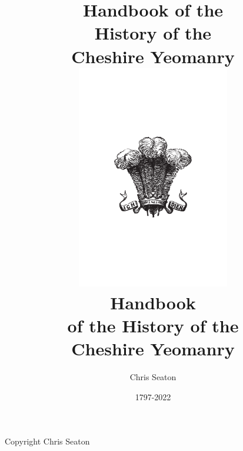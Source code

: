 \documentclass[a4paper,7pt]{book}
\title{Handbook of the \\ History of the \\ Cheshire Yeomanry}
\author{Chris Seaton}
\date{1797-2022}
\title{
  \includegraphics[width=0.5\textwidth]{front/feathers.pdf} \\
  \vspace{10mm}
  \huge Handbook \\
  \vspace{2mm}
  \Large of the History of the \\
  \Huge Cheshire Yeomanry
}
\begin{document}
\frontmatter

\maketitle

\vspace*{\fill}

\begin{center}
  Copyright  Chris Seaton
\end{center}

\setcounter{tocdepth}{0}
\tableofcontents{}

\mainmatter


% 
% 



\end{document}
